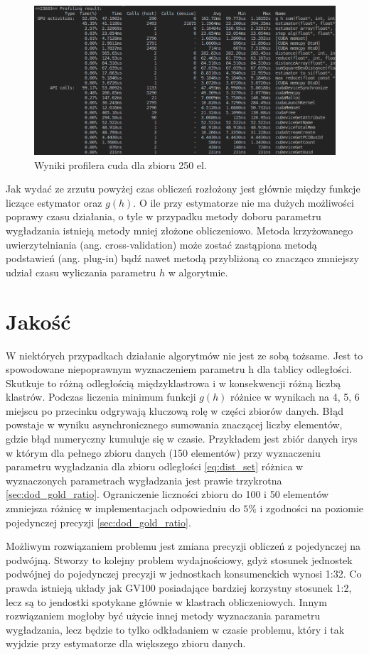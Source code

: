\begin{figure}[H]
\includegraphics[width=\textwidth]{img/nvprof250}
\caption{Wyniki profilera cuda dla zbioru 250 el.}
\end{figure}
Jak wydać ze zrzutu powyżej czas obliczeń rozłożony jest głównie między funkcje liczące estymator oraz $g(h)$. O ile przy estymatorze nie ma dużych możliwości poprawy czasu działania, o tyle w przypadku metody doboru parametru wygładzania istnieją metody mniej złożone obliczeniowo. Metoda krzyżowanego uwierzytelniania (ang. cross-validation) może zostać zastąpiona metodą podstawień (ang. plug-in) bądź nawet metodą przybliżoną \cite{Kul05} co znacząco zmniejszy udział czasu wyliczania parametru $h$ w algorytmie.

\section{Jakość}
\label{sec:jakosc}
W niektórych przypadkach działanie algorytmów nie jest ze sobą tożsame. Jest to spowodowane niepoprawnym wyznaczeniem parametru h dla tablicy odległości. Skutkuje to różną odległością międzyklastrowa i w konsekwencji różną liczbą klastrów. Podczas liczenia minimum funkcji $g(h)$ różnice w wynikach na 4, 5, 6 miejscu po przecinku odgrywają kluczową rolę w części zbiorów danych. Błąd powstaje w wyniku asynchronicznego sumowania znaczącej liczby elementów, gdzie błąd numeryczny kumuluje się w czasie. Przykładem jest zbiór danych irys w którym dla pełnego zbioru danych (150 elementów) przy wyznaczeniu parametru wygładzania dla zbioru odległości \eqref{eq:dist_set} różnica w wyznaczonych parametrach wygładzania jest prawie trzykrotna \ref{sec:dod_gold_ratio}. Ograniczenie liczności zbioru do 100 i 50 elementów zmniejsza różnicę w implementacjach odpowiedniu do $5 \%$ i zgodności na poziomie pojedynczej precyzji \ref{sec:dod_gold_ratio}.
 
Możliwym rozwiązaniem problemu jest zmiana precyzji obliczeń z pojedynczej na podwójną. Stworzy to kolejny problem wydajnościowy, gdyż stosunek jednostek podwójnej do pojedynczej precyzji w jednostkach konsumenckich wynosi 1:32. Co prawda istnieją układy jak GV100 posiadające bardziej korzystny stosunek 1:2, lecz są to jendostki spotykane głównie w klastrach obliczeniowych. Innym rozwiązaniem mogłoby być użycie innej metody wyznaczania parametru wygładzania, lecz będzie to tylko odkładaniem w czasie problemu, który i tak wyjdzie przy estymatorze dla większego zbioru danych.